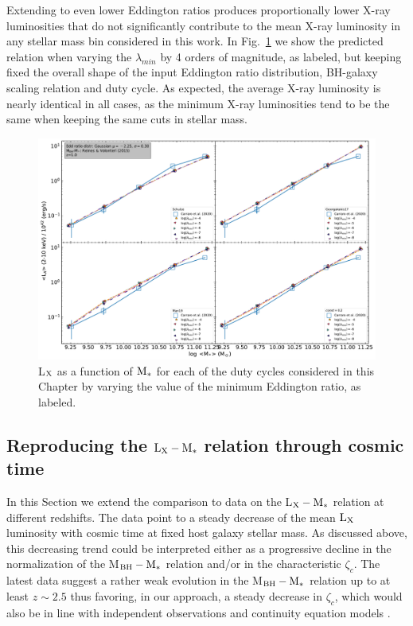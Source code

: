Extending to even lower Eddington ratios produces proportionally lower X-ray luminosities that do not significantly contribute to the mean X-ray luminosity in any stellar mass bin considered in this work. In Fig.~\ref{fig:test_lambda_min} we show the predicted  relation when varying the $\lambda_{min}$ by 4 orders of magnitude, as labeled, but keeping fixed the overall shape of the input Eddington ratio distribution, BH-galaxy scaling relation and duty cycle. 
As expected, the average X-ray luminosity is nearly identical in all cases, as the minimum X-ray luminosities tend to be the same when keeping the same cuts in stellar mass.

\begin{figure}
\begin{center}
\includegraphics[width=\textwidth]{Figs/Chapter3/Test_lambda_min_z1.0.pdf} 
  \caption{L$_{\rm X}$ as a function of ${\rm M}_*$ for each of the duty cycles considered in this Chapter by varying the value of the minimum Eddington ratio, as labeled.}
    \label{fig:test_lambda_min}
\end{center}
\end{figure}

\subsection{Reproducing the ${\rm L}_{\rm X}-{\rm M}_*$ relation through cosmic time}

In this Section we extend the comparison to data on the L$_{\rm X}-{\rm M}_*$ relation at different redshifts. The data point to a steady decrease of the mean ${\rm L}_{\rm X}$ luminosity with cosmic time at fixed host galaxy stellar mass. As discussed above, this decreasing trend could be interpreted either as a progressive decline in the normalization of the M$_{\rm BH}-{\rm M}_*$ relation and/or in the characteristic $\zeta_c$. The latest data suggest a rather weak evolution in the M$_{\rm BH}-{\rm M}_*$ relation up to at least $z\sim 2.5$ \citep[e.g.,][]{Suh20,Shankar20MNRAS} thus favoring, in our approach, a steady decrease in $\zeta_c$, which would also be in line with independent observations \citep[]{Kollmeier06} and continuity equation models \citep[][]{Shankar13Acc,Aversa15}.

